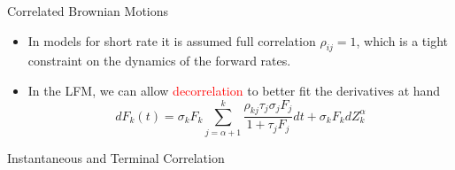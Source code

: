 \documentclass{beamer}
\begin{document}
\begin{frame}{Correlated Brownian Motions}
	\begin{itemize}
		\item In models for short rate it is assumed full correlation $\rho_{ij}=1$, which is a tight constraint on the dynamics of the forward rates.
		\item In the LFM, we can allow \textcolor{red}{decorrelation} to better fit the derivatives at hand
		\begin{equation*}
			dF_k(t) = \sigma_kF_k\sum_{j=\alpha+1}^k\frac{\boxed{\rho_{kj}}\tau_j\sigma_jF_j}{1+\tau_jF_j}dt+\sigma_kF_k dZ^\alpha_k
		\end{equation*}
	\end{itemize}
\end{frame}

\begin{frame}{Instantaneous and Terminal Correlation}
	

\end{frame}
\end{document}
